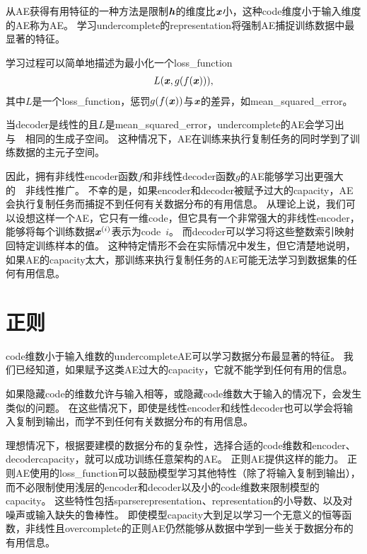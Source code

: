 从\gls{AE}获得有用特征的一种方法是限制$\boldsymbol{\mathit{h}}$的维度比$\boldsymbol{\mathit{x}}$小，这种\gls{code}维度小于输入维度的\gls{AE}称为\gls{AE}。
学习\gls{undercomplete}的\gls{representation}将强制\gls{AE}捕捉训练数据中最显著的特征。


学习过程可以简单地描述为最小化一个\gls{loss_function} 
\begin{align}
    L(\boldsymbol{\mathit{x}}, g(f(\boldsymbol{\mathit{x}}))),
\end{align}
其中$L$是一个\gls{loss_function}，惩罚$g(f(\boldsymbol{\mathit{x}}))$与$\boldsymbol{\mathit{x}}$的差异，如\gls{mean_squared_error}。


当\gls{decoder}是线性的且$L$是\gls{mean_squared_error}，\gls{undercomplete}的\gls{AE}会学习出与~~相同的生成子空间。
这种情况下，\gls{AE}在训练来执行复制任务的同时学到了训练数据的主元子空间。


因此，拥有非线性\gls{encoder}函数$f$和非线性\gls{decoder}函数$g$的\gls{AE}能够学习出更强大的~~非线性推广。
不幸的是，如果\gls{encoder}和\gls{decoder}被赋予过大的\gls{capacity}，\gls{AE}会执行复制任务而捕捉不到任何有关数据分布的有用信息。
从理论上说，我们可以设想这样一个\gls{AE}，它只有一维\gls{code}，但它具有一个非常强大的非线性\gls{encoder}，能够将每个训练数据$\boldsymbol{\mathit{x}}^{(i)}$表示为\gls{code}~$i$。
而\gls{decoder}可以学习将这些整数索引映射回特定训练样本的值。
这种特定情形不会在实际情况中发生，但它清楚地说明，如果\gls{AE}的\gls{capacity}太大，那训练来执行复制任务的\gls{AE}可能无法学习到数据集的任何有用信息。


\section{正则}
\label{sec:regularized_autoencoders}
\gls{code}维数小于输入维数的\gls{undercomplete}\gls{AE}可以学习数据分布最显著的特征。
我们已经知道，如果赋予这类\gls{AE}过大的\gls{capacity}，它就不能学到任何有用的信息。


如果隐藏\gls{code}的维数允许与输入相等，或隐藏\gls{code}维数大于输入的情况下，会发生类似的问题。
在这些情况下，即使是线性\gls{encoder}和线性\gls{decoder}也可以学会将输入复制到输出，而学不到任何有关数据分布的有用信息。


理想情况下，根据要建模的数据分布的复杂性，选择合适的\gls{code}维数和\gls{encoder}、\gls{decoder}\gls{capacity}，就可以成功训练任意架构的\gls{AE}。
正则\gls{AE}提供这样的能力。
正则\gls{AE}使用的\gls{loss_function}可以鼓励模型学习其他特性（除了将输入复制到输出），而不必限制使用浅层的\gls{encoder}和\gls{decoder}以及小的\gls{code}维数来限制模型的\gls{capacity}。
这些特性包括\gls{sparse}\gls{representation}、\gls{representation}的小导数、以及对噪声或输入缺失的鲁棒性。
即使模型\gls{capacity}大到足以学习一个无意义的恒等函数，非线性且\gls{overcomplete}的正则\gls{AE}仍然能够从数据中学到一些关于数据分布的有用信息。


